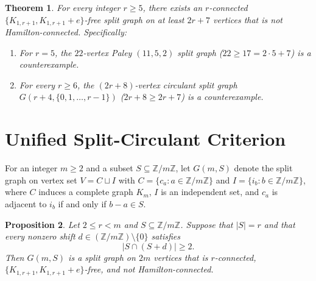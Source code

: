 \documentclass[11pt,a4paper]{article}
\newtheorem{theorem}{Theorem}
\newtheorem{proposition}[theorem]{Proposition}
\begin{document}
\begin{theorem}\label{thm:main}
For every integer $r \ge 5$, there exists an $r$-connected $\{K_{1,r+1}, K_{1,r+1}+e\}$-free split graph on at least $2r+7$ vertices that is not Hamilton-connected. Specifically:
\begin{enumerate}
\item For $r = 5$, the $22$-vertex Paley $(11,5,2)$ split graph ($22 \ge 17 = 2\cdot 5 + 7$) is a counterexample.
\item For every $r \ge 6$, the $(2r+8)$-vertex circulant split graph $G(r+4, \{0,1,\dots,r-1\})$ ($2r+8 \ge 2r+7$) is a counterexample.
\end{enumerate}
\end{theorem}

\section{Unified Split-Circulant Criterion}

For an integer $m \ge 2$ and a subset $S \subseteq \mathbb{Z}/m\mathbb{Z}$, let $G(m,S)$ denote the split graph on vertex set $V = C \sqcup I$ with $C = \{c_a : a \in \mathbb{Z}/m\mathbb{Z}\}$ and $I = \{i_b : b \in \mathbb{Z}/m\mathbb{Z}\}$, where $C$ induces a complete graph $K_m$, $I$ is an independent set, and $c_a$ is adjacent to $i_b$ if and only if $b - a \in S$.

\begin{proposition}\label{prop:criterion}
Let $2 \le r < m$ and $S \subseteq \mathbb{Z}/m\mathbb{Z}$. Suppose that $|S| = r$ and that every nonzero shift $d \in (\mathbb{Z}/m\mathbb{Z}) \setminus \{0\}$ satisfies
\begin{equation}\label{eq:inter}
|S \cap (S + d)| \ge 2.
\end{equation}
Then $G(m,S)$ is a split graph on $2m$ vertices that is $r$-connected, $\{K_{1,r+1}, K_{1,r+1}+e\}$-free, and not Hamilton-connected.
\end{proposition}
\end{document}

